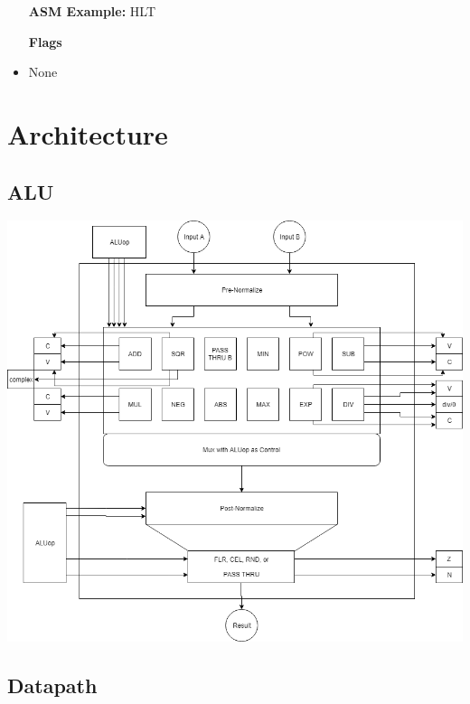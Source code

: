 \documentclass[a4paper,14pt]{article}
\begin{document}
\begin{itemize}
    \setlength{\parskip}{0pt}
    \setlength{\itemsep}{0pt plus 1pt}
    \setlength{\itemindent}{-4mm}
    \item[] \textbf{ASM Example:} HLT
\end{itemize}
\begin{itemize}
    \setlength{\parskip}{0pt}
    \setlength{\itemsep}{0pt plus 1pt}
    \setlength{\itemindent}{7mm}
    \item [\textbf{Flags}]
    \item None
\end{itemize}




\section{Architecture}

\subsection{ALU}
\begin{center}
\includegraphics[width=1\linewidth]{ALUDesign.png}
\end{center}

\subsection{Datapath}
\end{document}
